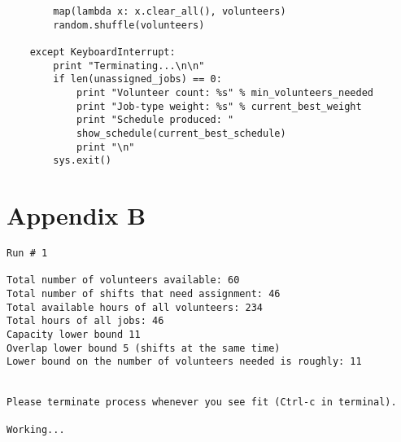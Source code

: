 \documentclass[11pt]{article}
\theoremstyle{definition}
\begin{document}
\begin{lstlisting}
        map(lambda x: x.clear_all(), volunteers)
        random.shuffle(volunteers)

    except KeyboardInterrupt:
        print "Terminating...\n\n"
        if len(unassigned_jobs) == 0:
            print "Volunteer count: %s" % min_volunteers_needed
            print "Job-type weight: %s" % current_best_weight
            print "Schedule produced: "
            show_schedule(current_best_schedule)
            print "\n"
        sys.exit()
\end{lstlisting}

\section{Appendix B}
\begin{lstlisting}
Run # 1

Total number of volunteers available: 60
Total number of shifts that need assignment: 46
Total available hours of all volunteers: 234
Total hours of all jobs: 46
Capacity lower bound 11
Overlap lower bound 5 (shifts at the same time)
Lower bound on the number of volunteers needed is roughly: 11


Please terminate process whenever you see fit (Ctrl-c in terminal).

Working...


\end{lstlisting}
\end{document}
